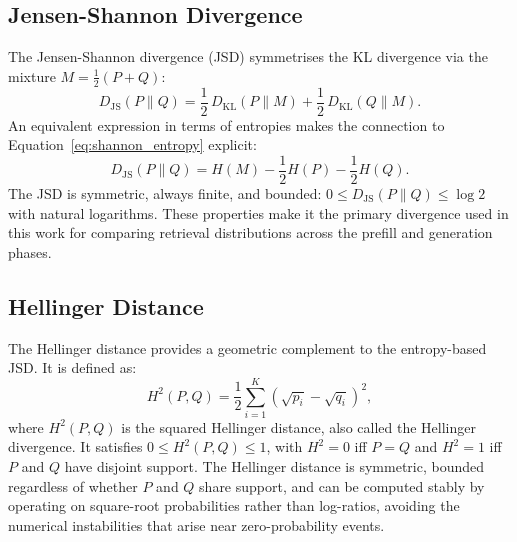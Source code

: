\subsection{Jensen-Shannon Divergence}
\label{subsec:js_divergence}

The Jensen-Shannon divergence (JSD) \citep{lin1991divergence} symmetrises the KL
divergence via the mixture $M = \tfrac{1}{2}(P + Q)$:
\begin{equation}
    D_{\mathrm{JS}}(P \| Q)
    =
    \frac{1}{2}\,D_{\mathrm{KL}}(P \| M)
    +
    \frac{1}{2}\,D_{\mathrm{KL}}(Q \| M).
    \label{eq:js_divergence}
\end{equation}
An equivalent expression in terms of entropies makes the connection to
Equation~\eqref{eq:shannon_entropy} explicit:
\begin{equation}
    D_{\mathrm{JS}}(P \| Q)
    =
    H(M) - \frac{1}{2}H(P) - \frac{1}{2}H(Q).
    \label{eq:js_entropy_form}
\end{equation}
The JSD is symmetric, always finite, and bounded: $0 \leq D_{\mathrm{JS}}(P \| Q)
\leq \log 2$ with natural logarithms. These properties make it the primary
divergence used in this work for comparing retrieval distributions across the
prefill and generation phases.

\subsection{Hellinger Distance}
\label{subsec:hellinger}

The Hellinger distance provides a geometric complement to
the entropy-based JSD. It is defined as:
\begin{equation}
    H^2(P, Q)
    =
    \frac{1}{2}\sum_{i=1}^{K}
    \!\left(\sqrt{p_i} - \sqrt{q_i}\right)^{\!2},
    \label{eq:hellinger_squared}
\end{equation}
where $H^2(P, Q)$ is the squared Hellinger distance, also called the Hellinger
divergence. It satisfies $0 \leq H^2(P, Q) \leq 1$, with $H^2 = 0$ iff $P = Q$
and $H^2 = 1$ iff $P$ and $Q$ have disjoint support. The Hellinger distance is
symmetric, bounded regardless of whether $P$ and $Q$ share support, and can be
computed stably by operating on square-root probabilities rather than log-ratios,
avoiding the numerical instabilities that arise near zero-probability events.

